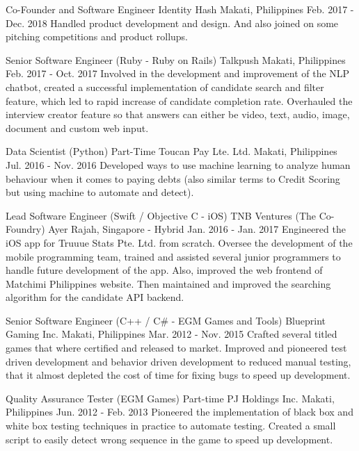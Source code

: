 \begin{cventries}
    \cventry
        {Co-Founder and Software Engineer}
        {Identity Hash}
        {Makati, Philippines}
        {Feb. 2017 - Dec. 2018}
        {Handled product development and design. And also joined on some pitching competitions and product rollups.}

    \cventry
        {Senior Software Engineer (Ruby - Ruby on Rails)}
        {Talkpush}
        {Makati, Philippines}
        {Feb. 2017 - Oct. 2017}
        {Involved in the development and improvement of the NLP chatbot, created a successful implementation of candidate search and filter feature, which led to rapid increase of candidate completion rate. Overhauled the interview creator feature so that answers can either be video, text, audio, image, document and custom web input.}

    \cventry
        {Data Scientist (Python) Part-Time}
        {Toucan Pay Lte. Ltd.}
        {Makati, Philippines}
        {Jul. 2016 - Nov. 2016}
        {Developed ways to use machine learning to analyze human behaviour when it comes to paying debts (also similar terms to Credit Scoring but using machine to automate and detect).}

    \cventry
        {Lead Software Engineer (Swift / Objective C - iOS)}
        {TNB Ventures (The Co-Foundry)}
        {Ayer Rajah, Singapore - Hybrid}
        {Jan. 2016 - Jan. 2017}
        {Engineered the iOS app for Truuue Stats Pte. Ltd. from scratch. Oversee the development of the mobile programming team, trained and assisted several junior programmers to handle future development of the app. Also, improved the web frontend of Matchimi Philippines website. Then maintained and improved the searching algorithm for the candidate API backend.}

    \cventry
        {Senior Software Engineer (C++ / C\# - EGM Games and Tools)}
        {Blueprint Gaming Inc.}
        {Makati, Philippines}
        {Mar. 2012 - Nov. 2015}
        {Crafted several titled games that where certified and released to market. Improved and pioneered test driven development and behavior driven development to reduced manual testing, that it almost depleted the cost of time for fixing bugs to speed up development.}

    \cventry
        {Quality Assurance Tester (EGM Games) Part-time}
        {PJ Holdings Inc.}
        {Makati, Philippines}
        {Jun. 2012 - Feb. 2013}
        {Pioneered the implementation of black box and white box testing techniques in practice to automate testing. Created a small script to easily detect wrong sequence in the game to speed up development.}


\end{cventries}
